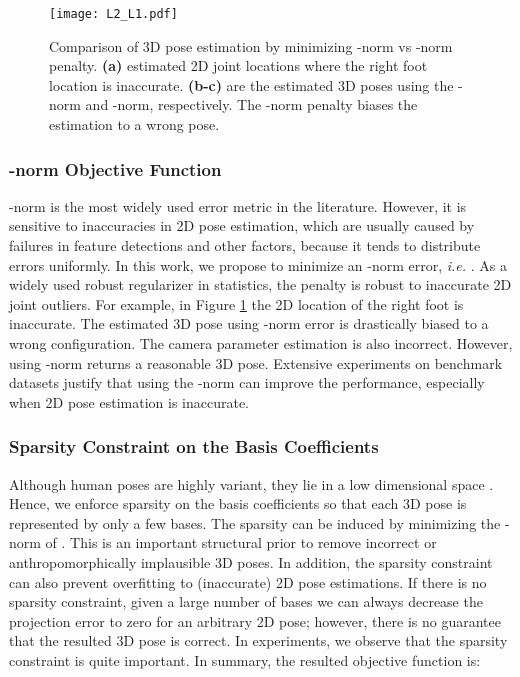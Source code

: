 \documentclass[10pt,twocolumn,letterpaper]{article}
\begin{document}
\begin{figure}[th]
\centering
\texttt{[image: L2\_L1.pdf]}
\caption{Comparison of 3D pose estimation by minimizing -norm
vs -norm penalty. \textbf{(a)} estimated 2D joint
locations where the right foot location is inaccurate.
\textbf{(b-c)} are the estimated 3D poses using the -norm and
-norm, respectively. The -norm penalty biases the
estimation to a wrong pose.}
\vspace{-1em} \label{fig:L1_L2_sample}
\end{figure}

\subsubsection{-norm Objective Function}
\label{sec:l1norm} -norm is the most widely used
error metric in the literature. However, it is
sensitive to inaccuracies in 2D pose estimation, which are usually
caused by failures in feature detections and other factors,
because it tends to distribute errors uniformly. In this work, we
propose to minimize an -norm error, {\em i.e.} . As a widely used robust regularizer in statistics, the
 penalty is robust to inaccurate 2D joint outliers. For
example, in Figure \ref{fig:L1_L2_sample} the 2D location of the
right foot is inaccurate. The estimated 3D pose using -norm
error is drastically biased to a wrong configuration. The
camera parameter estimation is also incorrect. However, using
-norm returns a reasonable 3D pose. Extensive experiments on
benchmark datasets justify that using the -norm can improve
the performance, especially when 2D pose estimation is
inaccurate.



\subsubsection{Sparsity Constraint on the Basis Coefficients}
Although human poses are highly variant, they lie in a
low dimensional space \cite{Safonova}. Hence, we enforce sparsity on
the basis coefficients  so that each 3D pose is
represented by only a few bases. The sparsity can be induced by
minimizing the -norm of . This is an important
structural prior to remove incorrect or anthropomorphically
implausible 3D poses. In addition, the sparsity constraint can
also prevent overfitting to (inaccurate) 2D pose estimations. If
there is no sparsity constraint, given a large number of bases we
can always decrease the projection error to zero for an arbitrary
2D pose; however, there is no guarantee that the resulted 3D pose
is correct. In experiments, we observe that the sparsity
constraint is quite important. In summary, the resulted objective function is:
\end{document}
